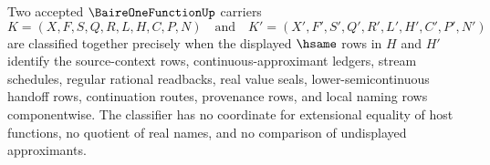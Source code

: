 \begin{definition}
\label{def:baireonefunction-classifier}
Two accepted $\BaireOneFunctionUp$ carriers
$$
K=(X,F,S,Q,R,L,H,C,P,N)
\quad\text{and}\quad
K'=(X',F',S',Q',R',L',H',C',P',N')
$$
are classified together precisely when the displayed $\hsame$ rows in $H$ and $H'$ identify the source-context rows, continuous-approximant ledgers, stream schedules, regular rational readbacks, real value seals, lower-semicontinuous handoff rows, continuation routes, provenance rows, and local naming rows componentwise. The classifier has no coordinate for extensional equality of host functions, no quotient of real names, and no comparison of undisplayed approximants.
\end{definition}

